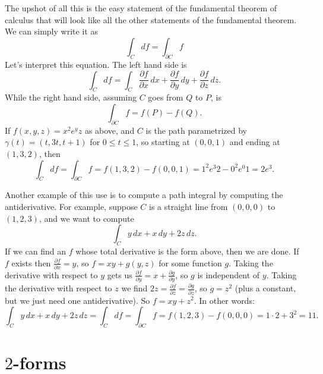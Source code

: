 \documentclass[12pt]{article}
\begin{document}
The upshot of all this is the easy statement of the fundamental theorem
of calculus that will look like all the other statements of the fundamental
theorem.  We can simply write it as
$$
\int_C df = \int_{\partial C} f
$$
Let's interpret this equation.  The left hand side is
$$
\int_C df = \int_C \frac{\partial f}{\partial x}\, dx + 
\frac{\partial f}{\partial y}\, dy + 
\frac{\partial f}{\partial z}\, dz .
$$
While the right hand side, assuming $C$ goes from $Q$ to $P$, is
$$
\int_{\partial C} f = f(P) - f(Q) .
$$
If $f(x,y,z) = 
x^2e^yz$ as above, and $C$ is the path parametrized by
$\gamma(t) = (t,3t,t+1)$ for $0 \leq t \leq 1$, so starting at $(0,0,1)$ and ending
at $(1,3,2)$, then
$$
\int_C df = \int_{\partial C} f = f(1,3,2)-f(0,0,1) = 1^2 e^3 2 - 0^2e^0 1 =
2e^3.
$$

Another example of this use is to compute a path integral by computing the
antiderivative.  For example, suppose $C$ is a straight line from $(0,0,0)$
to $(1,2,3)$, and we want to compute
\begin{equation*}
\int_C y \, dx + x \, dy + 2z \, dz.
\end{equation*}
If we can find an $f$ whose total derivative is the form above, then
we are done.  If $f$ exists then $\frac{\partial f}{\partial x} = y$,
so $f = xy + g(y,z)$ for some function $g$.  Taking the derivative
with respect to $y$ gets us
$\frac{\partial f}{\partial y} = x + \frac{\partial g}{\partial y}$,
so $g$ is independent of $y$.  Taking the derivative with respect
to $z$ we find
$2z = \frac{\partial f}{\partial z} = \frac{\partial g}{\partial z}$,
so $g = z^2$ (plus a constant, but we just need one antiderivative).
So $f = xy+z^2$.  In other words:
\begin{equation*}
\int_C y \, dx + x \, dy + 2z \, dz
=
\int_C df = \int_{\partial C} f
= f(1,2,3) - f(0,0,0) = 1\cdot 2+3^2 = 11.
\end{equation*}

\section*{$2$-forms}
\end{document}
